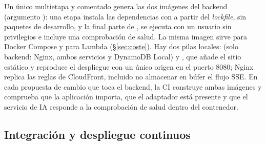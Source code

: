 Un único  multietapa y comentado genera las dos imágenes del backend (argumento
): una etapa instala las dependencias con  a partir del \emph{lockfile}, sin
paquetes de desarrollo, y la final parte de , se ejecuta con un usuario sin
privilegios e incluye una comprobación de salud. La misma imagen sirve para Docker Compose y para
Lambda (§\ref{sec:coste}). Hay dos pilas locales: 
(solo backend: Nginx, ambos servicios y DynamoDB Local) y , que añade el sitio
estático y reproduce el despliegue con un único origen en el puerto 8080; Nginx replica las reglas
de CloudFront, incluido no almacenar en búfer el flujo SSE. En cada propuesta de cambio que toca el backend, la CI construye ambas
imágenes y comprueba que la aplicación importa, que el adaptador está presente y que el servicio de
IA responde a la comprobación de salud dentro del contenedor.

\subsection{Integración y despliegue continuos}\label{sec:cicd}

